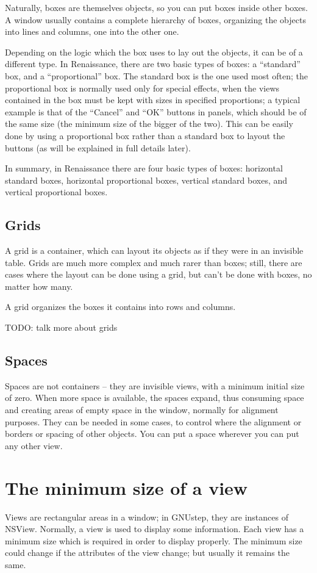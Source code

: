Naturally, boxes are themselves objects, so you can put boxes inside
other boxes.  A window usually contains a complete hierarchy of boxes,
organizing the objects into lines and columns, one into the other one.

Depending on the logic which the box uses to lay out the objects, it
can be of a different type.  In Renaissance, there are two basic types of
boxes: a ``standard'' box, and a ``proportional'' box.  The standard
box is the one used most often; the proportional box is normally used
only for special effects, when the views contained in the box must be
kept with sizes in specified proportions; a typical example is that of
the ``Cancel'' and ``OK'' buttons in panels, which should be of the
same size (the minimum size of the bigger of the two).  This can be
easily done by using a proportional box rather than a standard box to
layout the buttons (as will be explained in full details later).

In summary, in Renaissance there are four basic types of boxes:
horizontal standard boxes, horizontal proportional boxes, vertical
standard boxes, and vertical proportional boxes.

\subsection{Grids}
A grid is a container, which can layout its objects as if they were in
an invisible table.  Grids are much more complex and much rarer than
boxes; still, there are cases where the layout can be done using a
grid, but can't be done with boxes, no matter how many.

A grid organizes the boxes it contains into rows and columns.

TODO: talk more about grids

\subsection{Spaces}
Spaces are not containers -- they are invisible views, with a minimum
initial size of zero.  When more space is available, the spaces
expand, thus consuming space and creating areas of empty space in the
window, normally for alignment purposes.  They can be needed in some
cases, to control where the alignment or borders or spacing of other
objects.  You can put a space wherever you can put any other view.

\section{The minimum size of a view}
Views are rectangular areas in a window; in GNUstep, they are
instances of NSView.  Normally, a view is used to display some
information.  Each view has a minimum size which is required in order
to display properly.  The minimum size could change if the attributes
of the view change; but usually it remains the same.

